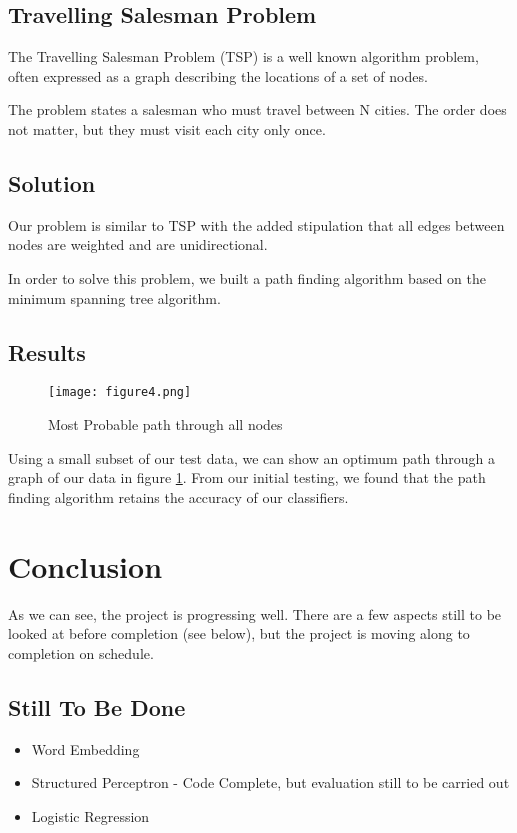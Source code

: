 \documentclass[12pt]{report}
\begin{document}
\section{Travelling Salesman Problem}
The Travelling Salesman Problem (TSP) is a well known algorithm problem, often expressed as a graph
describing the locations of a set of nodes.

The problem states a salesman who must travel between N  cities. The order does not matter,
but they must visit each city only once.

\section{Solution}
Our problem is similar to TSP with the added stipulation that all edges between nodes are weighted
and are unidirectional.

In order to solve this problem, we built a path finding algorithm based on the minimum spanning tree
algorithm.


\section{Results}
\begin{figure}[H]
  \centering
  \texttt{[image: figure4.png]}
  \label{figure:graph}
  \caption{Most Probable path through all nodes}
\end{figure}

Using a small subset of our test data, we can show an optimum path through a graph of our data in
figure \ref{figure:graph}. From our initial testing, we found that the path finding algorithm retains
the accuracy of our classifiers.

\chapter{Conclusion}
As we can see, the project is progressing well.
There are a few aspects still to be looked at before completion (see below), but the project is moving
along to completion on schedule.


\section{Still To Be Done}
\begin{itemize}
\item Word Embedding
\item Structured Perceptron - Code Complete, but evaluation still to be carried out
\item Logistic Regression
  \end{itemize}

{}
\end{document}

